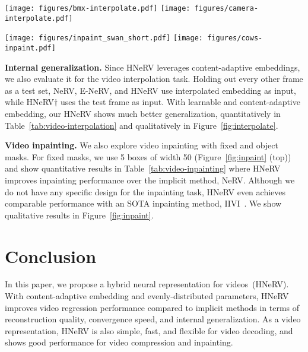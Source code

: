 \documentclass[10pt,twocolumn,letterpaper]{article}
\begin{document}
\begin{figure*}[t]
    \centering    
    \texttt{[image: figures/bmx-interpolate.pdf]}
    \texttt{[image: figures/camera-interpolate.pdf]}
    \vspace{-1.2em}
    \caption{Visualization of \textbf{Embedding interpolation}.}
    \label{fig:interpolate}    

    \vspace{1.5em}
    \centering
    \texttt{[image: figures/inpaint\_swan\_short.pdf]}
    \texttt{[image: figures/cows-inpaint.pdf]} 
    \vspace{-0.5em}
    \caption{\textbf{Inpainting} results of fixed masks and object masks.
    \textbf{Left)} input frame; \textbf{Right)} HNeRV output.}    
    \label{fig:inpaint}    
\end{figure*}


\noindent\textbf{Internal generalization.}
Since HNeRV leverages content-adaptive embeddings, we also evaluate it for the video interpolation task.
Holding out every other frame as a test set, NeRV, E-NeRV, and HNeRV use interpolated embedding as input, while HNeRV$\dagger$ uses the test frame as input.
With learnable and content-adaptive embedding, our HNeRV shows much better generalization, quantitatively in Table~\ref{tab:video-interpolation} and qualitatively in Figure~\ref{fig:interpolate}.


\noindent\textbf{Video inpainting.}
We also explore video inpainting with fixed and object masks.
For fixed masks, we use 5 boxes of width 50 (Figure~\ref{fig:inpaint} (top)) and show quantitative results in Table~\ref{tab:video-inpainting} where HNeRV improves inpainting performance over the implicit method, NeRV.
Although we do not have any specific design for the inpainting task, HNeRV even achieves comparable performance with an SOTA inpainting method, IIVI~\cite{ouyang2021video}.
We show qualitative results in Figure~\ref{fig:inpaint}.


\section{Conclusion}
\label{sec:conclusion}

In this paper, we propose a hybrid neural representation for videos~(HNeRV).
With content-adaptive embedding and evenly-distributed parameters, HNeRV improves video regression performance compared to implicit methods in terms of reconstruction quality, convergence speed, and internal generalization.
As a video representation, HNeRV is also simple, fast, and flexible for video decoding, and shows good performance for video compression and inpainting.
\end{document}
